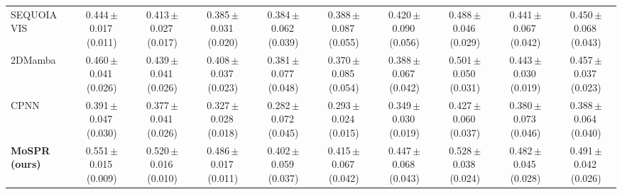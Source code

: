 \begin{tabular}{lccccccccc}
SEQUOIA VIS & 0.444\,{\tiny$\pm$}0.017\,{\tiny(0.011)} & 0.413\,{\tiny$\pm$}0.027\,{\tiny(0.017)} & 0.385\,{\tiny$\pm$}0.031\,{\tiny(0.020)} & 0.384\,{\tiny$\pm$}0.062\,{\tiny(0.039)} & 0.388\,{\tiny$\pm$}0.087\,{\tiny(0.055)} & 0.420\,{\tiny$\pm$}0.090\,{\tiny(0.056)} & 0.488\,{\tiny$\pm$}0.046\,{\tiny(0.029)} & 0.441\,{\tiny$\pm$}0.067\,{\tiny(0.042)} & 0.450\,{\tiny$\pm$}0.068\,{\tiny(0.043)}\\
2DMamba & 0.460\,{\tiny$\pm$}0.041\,{\tiny(0.026)} & 0.439\,{\tiny$\pm$}0.041\,{\tiny(0.026)} & 0.408\,{\tiny$\pm$}0.037\,{\tiny(0.023)} & 0.381\,{\tiny$\pm$}0.077\,{\tiny(0.048)} & 0.370\,{\tiny$\pm$}0.085\,{\tiny(0.054)} & 0.388\,{\tiny$\pm$}0.067\,{\tiny(0.042)} & 0.501\,{\tiny$\pm$}0.050\,{\tiny(0.031)} & 0.443\,{\tiny$\pm$}0.030\,{\tiny(0.019)} & 0.457\,{\tiny$\pm$}0.037\,{\tiny(0.023)}\\
CPNN & 0.391\,{\tiny$\pm$}0.047\,{\tiny(0.030)} & 0.377\,{\tiny$\pm$}0.041\,{\tiny(0.026)} & 0.327\,{\tiny$\pm$}0.028\,{\tiny(0.018)} & 0.282\,{\tiny$\pm$}0.072\,{\tiny(0.045)} & 0.293\,{\tiny$\pm$}0.024\,{\tiny(0.015)} & 0.349\,{\tiny$\pm$}0.030\,{\tiny(0.019)} & 0.427\,{\tiny$\pm$}0.060\,{\tiny(0.037)} & 0.380\,{\tiny$\pm$}0.073\,{\tiny(0.046)} & 0.388\,{\tiny$\pm$}0.064\,{\tiny(0.040)}\\
\textbf{MoSPR (ours)} & 0.551\,{\tiny$\pm$}0.015\,{\tiny(0.009)} & 0.520\,{\tiny$\pm$}0.016\,{\tiny(0.010)} & 0.486\,{\tiny$\pm$}0.017\,{\tiny(0.011)} & 0.402\,{\tiny$\pm$}0.059\,{\tiny(0.037)} & 0.415\,{\tiny$\pm$}0.067\,{\tiny(0.042)} & 0.447\,{\tiny$\pm$}0.068\,{\tiny(0.043)} & 0.528\,{\tiny$\pm$}0.038\,{\tiny(0.024)} & 0.482\,{\tiny$\pm$}0.045\,{\tiny(0.028)} & 0.491\,{\tiny$\pm$}0.042\,{\tiny(0.026)}\\
\bottomrule
\end{tabular}
